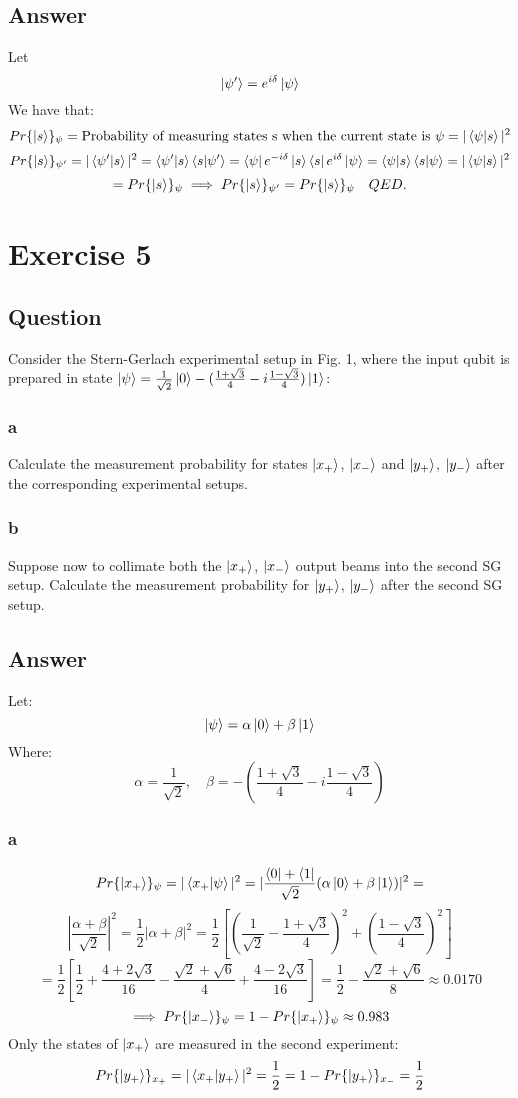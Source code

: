 \documentclass{article}
\begin{document}
\subsection{Answer}
Let 
$$\ket{\psi'} = e^{i\delta}\ket{\psi}$$
We have that:
$$ Pr\{\ket{s}\}_{\psi} = \text{Probability of measuring states s when the current state is $\psi$} = |\braket{\psi}{s}|^2  $$
$$Pr\{\ket{s}\}_{\psi'} = |\braket{\psi'}{s}|^2 = \braket{\psi'}{s}\braket{s}{\psi'} = \bra{\psi}e^{-i\delta}\ket{s}\bra{s}e^{i\delta}\ket{\psi} = \braket{\psi}{s}\braket{s}{\psi} = |\braket{\psi}{s}|^2 $$
$$= Pr\{\ket{s}\}_{\psi} \implies Pr\{\ket{s}\}_{\psi'} = Pr\{\ket{s}\}_{\psi} \quad QED.$$

\section{Exercise 5}
\subsection{Question}
Consider the Stern-Gerlach experimental setup in Fig. 1, where the input qubit is prepared in state $\ket{\psi} = \frac{1}{\sqrt{2}}\ket{0} - (\frac{1+\sqrt{3}}{4} - i\frac{1-\sqrt{3}}{4})\ket{1}$:
\subsubsection{a}
Calculate the measurement probability for states $\ket{x_+}$, $\ket{x_-}$ and $\ket{y_+}$, $\ket{y_-}$ after the corresponding experimental setups.  
\subsubsection{b}
Suppose now to collimate both the $\ket{x_+}$, $\ket{x_-}$ output beams into the second SG setup. Calculate the measurement probability for $\ket{y_+}$, $\ket{y_-}$ after the second SG setup.  
\subsection{Answer}
Let:
$$\ket{\psi} = \alpha\ket{0} + \beta\ket{1}$$
Where:
$$\alpha = \frac{1}{\sqrt{2}},\quad \beta = - (\frac{1+\sqrt{3}}{4} - i\frac{1-\sqrt{3}}{4}) $$
\subsubsection{a}
$$Pr\{\ket{x_+}\}_{\psi} = |\braket{x_+}{\psi}|^2 = |\frac{\bra{0}+\bra{1}}{\sqrt{2}}(\alpha\ket{0} + \beta\ket{1})|^2 = $$
$$|\frac{\alpha + \beta}{\sqrt{2}}|^2 = \frac{1}{2}|\alpha + \beta|^2 = \frac{1}{2}[(\frac{1}{\sqrt{2}} - \frac{1+\sqrt{3}}{4} )^2 + (\frac{1-\sqrt{3}}{4})^2]$$
$$= \frac{1}{2}[\frac{1}{2} + \frac{4 + 2\sqrt{3}}{16} - \frac{\sqrt{2} + \sqrt{6}}{4} + \frac{4 - 2\sqrt{3}}{16}] = \frac{1}{2} - \frac{\sqrt{2} + \sqrt{6}}{8} \approx 0.0170$$
$$\implies Pr\{\ket{x_-}\}_{\psi} = 1 - Pr\{\ket{x_+}\}_{\psi} \approx 0.983$$
Only the states of $\ket{x_+}$ are measured in the second experiment:
$$Pr\{\ket{y_+}\}_{x_+} = |\braket{x_+}{y_+}|^2 = \frac{1}{2} = 1 - Pr\{\ket{y_+}\}_{x_-} = \frac{1}{2}$$
\end{document}
